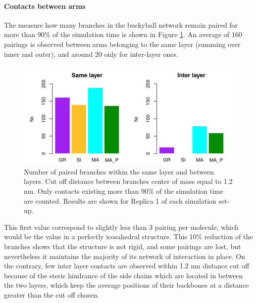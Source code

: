 \paragraph{Contacts between arms} The measure how many branches in the buckyball network remain paired for more than 90\% of the simulation time is shown in Figure \ref{fig:BTI_beta}. An average of 160 pairings is observed between arms belonging to the same layer (summing over inner and outer), and around 20 only for inter-layer ones.
%
\begin{figure}[t]
\centering
\includegraphics[width=0.85\linewidth]{3results_capsule/pics/stAll_beta_90_R1.png}
\caption[Branch pairing during simulations of the buckyball]{Number of paired branches within the same layer and between layers. Cut off distance between branches center of mass equal to 1.2 nm. Only contacts existing more than 90\% of the simulation time are counted. Results are shown for Replica 1 of each simulation set-up.}
\label{fig:BTI_beta}
\end{figure}
%
This first value correspond to slightly less than 3 pairing per molecule, which would be the value in a perfectly icosahedral structure. This 10\% reduction of the branches shows that the structure is not rigid, and some pairings are lost, but nevertheless it maintains the majority of its network of interaction in place.
%
On the contrary, few inter layer contacts are observed within 1.2 nm distance cut off because of the steric hindrance of the side chains which are located in between the two layers, which keep the average positions of their backbones at a distance greater than the cut off chosen.

